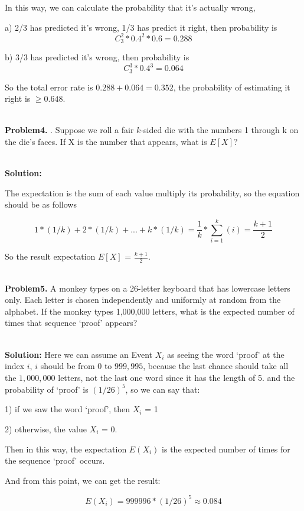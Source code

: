 \documentclass{article}
\begin{document}
In this way, we can calculate the probability that it's actually wrong,

a) 2/3 has predicted it's wrong, 1/3 has predict it right, then probability is
$$C_3^2 * {0.4}^2 * 0.6 = 0.288$$

b) 3/3 has predicted it's wrong, then probability is
$$C_3^3 * {0.4}^3 = 0.064$$

So the total error rate is $0.288+0.064=0.352$, the probability of estimating it right is $\ge 0.648$.

~\\


\noindent \textbf{Problem4.} . Suppose we roll a fair $k$-sided die with the numbers 1 through k on the die's faces. If X is the number that appears, what is $E[X]$?

~\\

\noindent \textbf{Solution:}

The expectation is the sum of each value multiply its probability, so the equation should be as follows

$$ 1 * (1/k) + 2 * (1/k) + ... + k * (1/k) = \frac{1}{k} * \sum_{i=1}^{k}(i) = \frac{k+1}{2}$$

So the result expectation $E[X]$ = $\frac{k+1}{2}$.

~\\

\noindent \textbf{Problem5.} A monkey types on a 26-letter keyboard that has lowercase letters only. Each letter is chosen independently and uniformly at random from the alphabet. If the monkey types 1,000,000 letters, what is
the expected number of times that sequence `proof' appears?

~\\

\noindent \textbf{Solution:}
Here we can assume an Event $X_i$ as seeing the word `proof' at the index $i$, $i$ should be from 0 to $999,995$, because the last chance should take all the $1,000,000$ letters, not the last one word since it has the length of 5.
and the probability of `proof' is $(1/26)^5$, so we can say that:

1) if we saw the word `proof', then $X_i$ = 1

2) otherwise, the value $X_i$ = 0.

Then in this way, the expectation $E(X_i)$ is the expected number of times for the sequence `proof' occurs.

And from this point, we can get the result:

$$E(X_i) = 999996 * (1/26)^5 \approx 0.084$$

~\\ %
\end{document}
